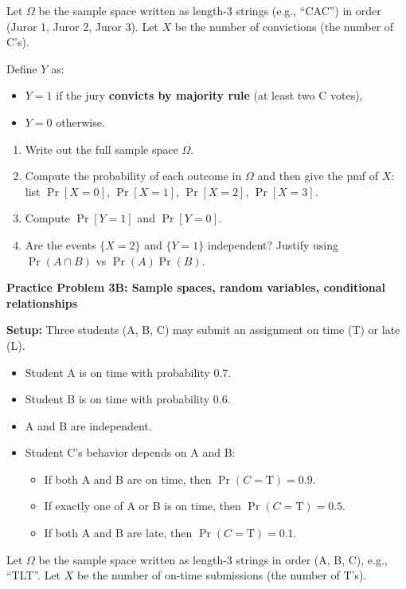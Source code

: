 \documentclass[12pt]{article}
\begin{document}
Let $\Omega$ be the sample space written as length-3 strings (e.g., ``CAC'') in order (Juror 1, Juror 2, Juror 3).
Let $X$ be the number of convictions (the number of C's).

Define $Y$ as:
\begin{itemize}
  \item $Y=1$ if the jury \textbf{convicts by majority rule} (at least two C votes),
  \item $Y=0$ otherwise.
\end{itemize}

\begin{enumerate}[label=\arabic*\alph*)]
  \item Write out the full sample space $\Omega$.
  \item Compute the probability of each outcome in $\Omega$ and then give the pmf of $X$:
  list $\Pr[X=0]$, $\Pr[X=1]$, $\Pr[X=2]$, $\Pr[X=3]$.
  \item Compute $\Pr[Y=1]$ and $\Pr[Y=0]$.
  \item Are the events $\{X=2\}$ and $\{Y=1\}$ independent? Justify using $\Pr(A\cap B)$ vs $\Pr(A)\Pr(B)$.
\end{enumerate}

\vspace{1em}

\noindent\textbf{Practice Problem 3B: Sample spaces, random variables, conditional relationships}

\noindent \textbf{Setup:} Three students (A, B, C) may submit an assignment on time (T) or late (L).
\begin{itemize}
  \item Student A is on time with probability $0.7$.
  \item Student B is on time with probability $0.6$.
  \item A and B are independent.
  \item Student C’s behavior depends on A and B:
  \begin{itemize}
    \item If both A and B are on time, then $\Pr(C=\text{T})=0.9$.
    \item If exactly one of A or B is on time, then $\Pr(C=\text{T})=0.5$.
    \item If both A and B are late, then $\Pr(C=\text{T})=0.1$.
  \end{itemize}
\end{itemize}

Let $\Omega$ be the sample space written as length-3 strings in order (A, B, C), e.g., ``TLT''.
Let $X$ be the number of on-time submissions (the number of T's).
\end{document}
